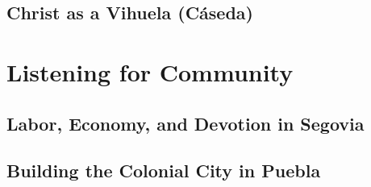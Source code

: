 \documentclass{vcbook}
\begin{document}
\chapter{Christ as a Vihuela (Cáseda)}
% 

\part{Listening for Community}

\chapter{Labor, Economy, and Devotion in Segovia}
% 

\chapter{Building the Colonial City in Puebla}
% 

\printbibliography
\end{document}
